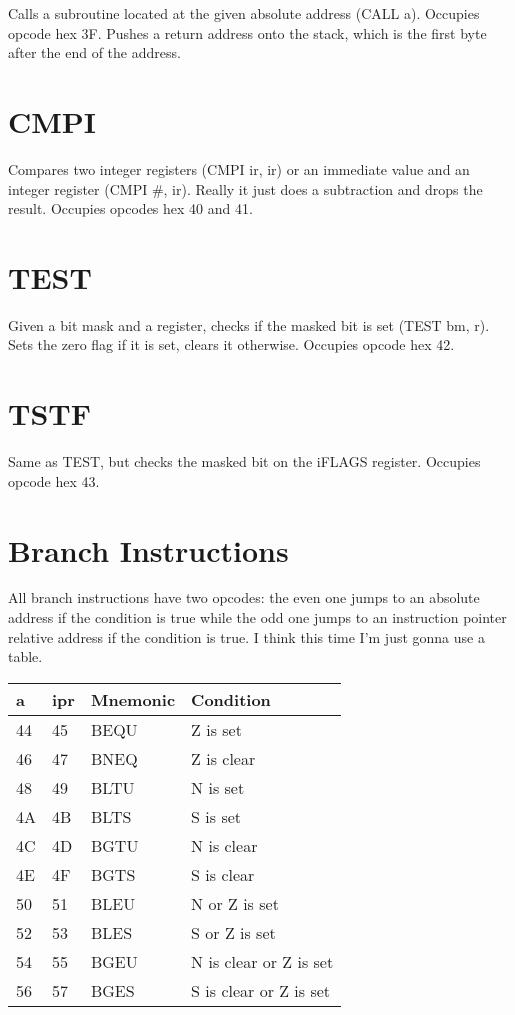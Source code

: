 \documentclass[letterpaper,12pt]{book}
\begin{document}
Calls a subroutine located at the given absolute address (CALL a). Occupies opcode hex 3F. Pushes a return address onto the stack, which is the first byte after the end of the address.

\section{CMPI}

Compares two integer registers (CMPI ir, ir) or an immediate value and an integer register (CMPI \#, ir). Really it just does a subtraction and drops the result. Occupies opcodes hex 40 and 41.

\section{TEST}

Given a bit mask and a register, checks if the masked bit is set (TEST bm, r). Sets the zero flag if it is set, clears it otherwise. Occupies opcode hex 42.

\section{TSTF}

Same as TEST, but checks the masked bit on the iFLAGS register. Occupies opcode hex 43.

\section{Branch Instructions}

All branch instructions have two opcodes: the even one jumps to an absolute address if the condition is true while the odd one jumps to an instruction pointer relative address if the condition is true. I think this time I'm just gonna use a table.

\begin{tabular}{|l|l|l|l|}
\hline
	a & ipr & Mnemonic & Condition\\
\hline
	44 & 45 & BEQU & Z is set\\
	46 & 47 & BNEQ & Z is clear\\
	48 & 49 & BLTU & N is set\\
	4A & 4B & BLTS & S is set\\
	4C & 4D & BGTU & N is clear\\
	4E & 4F & BGTS & S is clear\\
	50 & 51 & BLEU & N or Z is set\\
	52 & 53 & BLES & S or Z is set\\
	54 & 55 & BGEU & N is clear or Z is set\\
	56 & 57 & BGES & S is clear or Z is set\\
\hline
\end{tabular}
\end{document}

